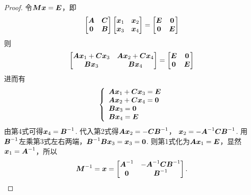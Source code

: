\begin{example}
\begin{proof}
令\(\boldsymbol{M}\boldsymbol{x}=\boldsymbol{E}\)，即\begin{equation*}
	\begin{bmatrix}
		\boldsymbol{A} & \boldsymbol{C} \\
		\boldsymbol0 & \boldsymbol{B}
	\end{bmatrix}
	\begin{bmatrix}
		\boldsymbol{x}_1 & \boldsymbol{x}_2 \\
		\boldsymbol{x}_3 & \boldsymbol{x}_4
	\end{bmatrix}
	= \begin{bmatrix}
		\boldsymbol{E} & \boldsymbol0 \\
		\boldsymbol0 & \boldsymbol{E}
	\end{bmatrix}
\end{equation*}则\begin{equation*}
	\begin{bmatrix}
		\boldsymbol{A}\boldsymbol{x}_1+\boldsymbol{C}\boldsymbol{x}_3 & \boldsymbol{A}\boldsymbol{x}_2+\boldsymbol{C}\boldsymbol{x}_4 \\
		\boldsymbol{B}\boldsymbol{x}_3 & \boldsymbol{B}\boldsymbol{x}_4
	\end{bmatrix}
	= \begin{bmatrix}
		\boldsymbol{E} & \boldsymbol0 \\
		\boldsymbol0 & \boldsymbol{E}
	\end{bmatrix}
\end{equation*}
进而有\begin{equation*}
	\left\{ \begin{array}{l}
		\boldsymbol{A}\boldsymbol{x}_1+\boldsymbol{C}\boldsymbol{x}_3 = \boldsymbol{E} \\
		\boldsymbol{A}\boldsymbol{x}_2+\boldsymbol{C}\boldsymbol{x}_4 = \boldsymbol0 \\
		\boldsymbol{B}\boldsymbol{x}_3 = \boldsymbol0 \\
		\boldsymbol{B}\boldsymbol{x}_4 = \boldsymbol{E}
	\end{array} \right.
\end{equation*}
由第4式可得\(\boldsymbol{x}_4 = \boldsymbol{B}^{-1}\).
代入第2式得\(\boldsymbol{A}\boldsymbol{x}_2=-\boldsymbol{C}\boldsymbol{B}^{-1}\)，
\(\boldsymbol{x}_2=-\boldsymbol{A}^{-1}\boldsymbol{C}\boldsymbol{B}^{-1}\).
用\(\boldsymbol{B}^{-1}\)左乘第3式左右两端，\(\boldsymbol{B}^{-1}\boldsymbol{B}\boldsymbol{x}_3=\boldsymbol{x}_3=\boldsymbol0\).
则第1式化为\(\boldsymbol{A}\boldsymbol{x}_1=\boldsymbol{E}\)，显然\(\boldsymbol{x}_1=\boldsymbol{A}^{-1}\)，所以\begin{equation*}
	\boldsymbol{M}^{-1} = \boldsymbol{x} = \begin{bmatrix}
		\boldsymbol{A}^{-1} & -\boldsymbol{A}^{-1}\boldsymbol{C}\boldsymbol{B}^{-1} \\
		\boldsymbol0 & \boldsymbol{B}^{-1}
	\end{bmatrix}.
	\qedhere
\end{equation*}
\end{proof}
\end{example}

